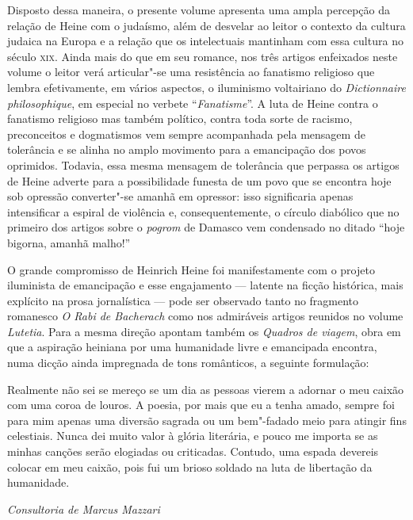 Disposto dessa maneira, o presente volume apresenta uma ampla percepção da relação de Heine com o judaísmo, além de desvelar ao leitor o contexto da cultura judaica na Europa e a relação que os intelectuais mantinham com essa cultura no século \textsc{xix}.
Ainda mais do que em seu romance,
nos três artigos enfeixados neste volume o leitor verá articular"-se
uma resistência ao fanatismo religioso que lembra efetivamente, em
vários aspectos, o iluminismo voltairiano do \textit{Dictionnaire
philosophique}, em especial no verbete
“\textit{Fanatisme}”. A luta de Heine contra o fanatismo religioso mas
também político, contra toda sorte de racismo, preconceitos e
dogmatismos vem sempre acompanhada pela mensagem de tolerância e se
alinha no amplo movimento para a emancipação dos povos oprimidos.
Todavia, essa mesma mensagem de tolerância que perpassa os artigos de
Heine adverte para a possibilidade funesta de um povo que se encontra
hoje sob opressão converter"-se amanhã em opressor: isso significaria
apenas intensificar a espiral de violência e, consequentemente, o
círculo diabólico que no primeiro dos artigos sobre o \textit{pogrom}
de Damasco vem condensado no ditado “hoje bigorna, amanhã malho!”

 O grande compromisso de Heinrich Heine foi manifestamente com o projeto
iluminista de emancipação e esse engajamento --- latente na ficção
histórica, mais explícito na prosa jornalística --- pode ser observado
tanto no fragmento romanesco \textit{O Rabi de Bacherach} como nos
admiráveis artigos reunidos no volume \textit{Lutetia}. Para a mesma
direção apontam também os \textit{Quadros de viagem}, obra em que a
aspiração heiniana por uma humanidade livre e emancipada encontra, numa
dicção ainda impregnada de tons românticos, a seguinte formulação:

\begin{hedraquote}
Realmente não sei se mereço se um dia as pessoas vierem a adornar o
meu caixão com uma coroa de louros. A poesia, por mais que eu a tenha
amado, sempre foi para mim apenas uma diversão sagrada ou um
bem"-fadado meio para atingir fins celestiais. Nunca dei muito valor à
glória literária, e pouco me importa se as minhas canções serão
elogiadas ou criticadas. Contudo, uma espada devereis colocar em meu
caixão, pois fui um brioso soldado na luta de libertação da
humanidade.
\end{hedraquote}

\bigskip

\hfill{\itshape\small Consultoria de Marcus Mazzari}

